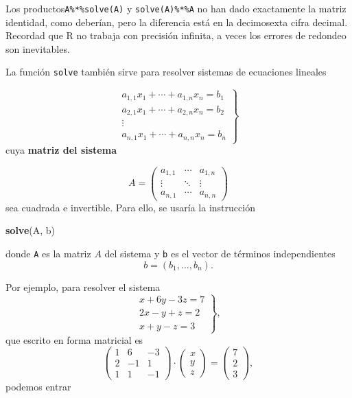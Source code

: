 \documentclass[
]{book}
\newenvironment{Shaded}{\begin{snugshade}}{\end{snugshade}}
\newcommand{\KeywordTok}[1]{\textcolor[rgb]{0.13,0.29,0.53}{\textbf{#1}}}
\newcommand{\NormalTok}[1]{#1}
\theoremstyle{definition}
\theoremstyle{definition}
\theoremstyle{definition}
\theoremstyle{remark}
\begin{document}
Los productos\texttt{A\%*\%solve(A)} y \texttt{solve(A)\%*\%A} no han dado exactamente la matriz identidad, como deberían, pero la diferencia está en la decimosexta cifra decimal. Recordad que R no trabaja con precisión infinita, a veces los errores de redondeo son inevitables.

La función \texttt{solve} también sirve para resolver sistemas de ecuaciones lineales

\[
\left.\begin{array}{c}
a_{1,1} x_1+\cdots +a_{1,n}x_n = b_1 \\
a_{2,1} x_1+\cdots +a_{2,n}x_n = b_2 \\
\vdots\qquad\ \\
a_{n,1} x_1+\cdots +a_{n,n}x_n = b_n
\end{array}
\right\}
\]
cuya \textbf{matriz del sistema}

\[
A=\left(\begin{array}{ccc}
a_{1,1} & \cdots & a_{1,n} \\
\vdots & \ddots & \vdots\\
a_{n,1} & \cdots & a_{n,n}
\end{array}
\right)
\]
sea cuadrada e invertible. Para ello, se usaría la instrucción

\begin{Shaded}
\begin{Highlighting}[]
\KeywordTok{solve}\NormalTok{(A, b)}
\end{Highlighting}
\end{Shaded}

donde \texttt{A} es la matriz \(A\) del sistema y \texttt{b} es el vector de términos independientes
\[
b=(b_1, \ldots, b_{n}).
\]

Por ejemplo, para resolver el sistema
\[
\left.\begin{array}{r}
x+6y-3z = 7 \\
2x-y+z = 2\\
x+y-z = 3
\end{array}
\right\},
\]
que escrito en forma matricial es
\[
\left(\begin{array}{ccc}
1 & 6 & -3 \\ 2 & -1 & 1 \\ 1 & 1 & -1\end{array}
\right)\cdot 
\left(\begin{array}{c} x \\ y \\ z \end{array}
\right)=
\left(\begin{array}{c} 7 \\ 2 \\ 3 \end{array}
\right), 
\]
podemos entrar
\end{document}
